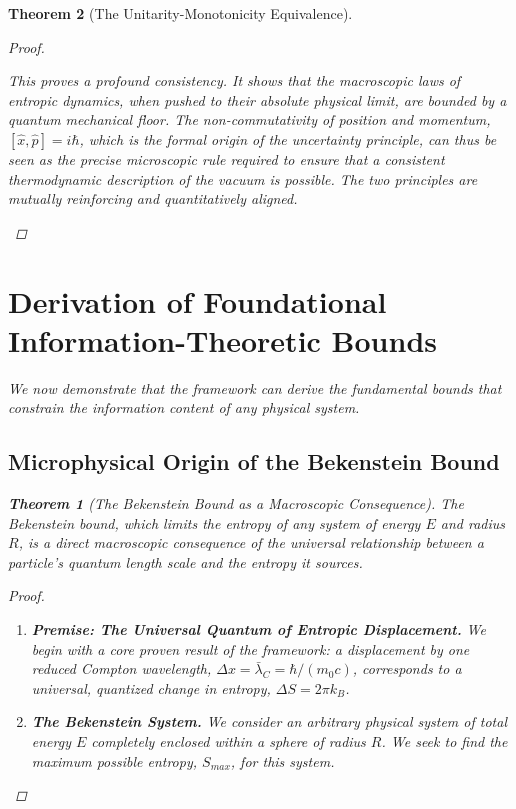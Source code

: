 \documentclass[11pt, letterpaper]{report}
\theoremstyle{plain} %
\newtheorem{theorem}{Theorem}[chapter]
\theoremstyle{definition} %
\theoremstyle{remark} %
\begin{document}
\begin{theorem}[The Unitarity-Monotonicity Equivalence]
\begin{proof}
\begin{enumerate}
    This proves a profound consistency. It shows that the macroscopic laws of entropic dynamics, when pushed to their absolute physical limit, are bounded by a quantum mechanical floor. The non-commutativity of position and momentum, $[\hat{x}, \hat{p}] = i\hbar$, which is the formal origin of the uncertainty principle, can thus be seen as the precise microscopic rule required to ensure that a consistent thermodynamic description of the vacuum is possible. The two principles are mutually reinforcing and quantitatively aligned.
\end{enumerate}
\end{proof}








\section{Derivation of Foundational Information-Theoretic Bounds}
\label{sec:verify_bounds}

We now demonstrate that the framework can derive the fundamental bounds that constrain the information content of any physical system.

\subsection{Microphysical Origin of the Bekenstein Bound}
\label{subsec:verify_bekenstein}

\begin{theorem}[The Bekenstein Bound as a Macroscopic Consequence]
\label{thm:verify_bekenstein_bound}
The Bekenstein bound, which limits the entropy of any system of energy $E$ and radius $R$, is a direct macroscopic consequence of the universal relationship between a particle's quantum length scale and the entropy it sources.
\end{theorem}
\begin{proof}
\begin{enumerate}
    \item \textbf{Premise: The Universal Quantum of Entropic Displacement.} We begin with a core proven result of the framework: a displacement by one reduced Compton wavelength, $\Delta x = \bar{\lambda}_C = \hbar/(m_0c)$, corresponds to a universal, quantized change in entropy, $\Delta S = 2\pi k_B$.

    \item \textbf{The Bekenstein System.} We consider an arbitrary physical system of total energy $E$ completely enclosed within a sphere of radius $R$. We seek to find the maximum possible entropy, $S_{max}$, for this system.


\end{enumerate}
\end{proof}
\end{theorem}
\end{document}

